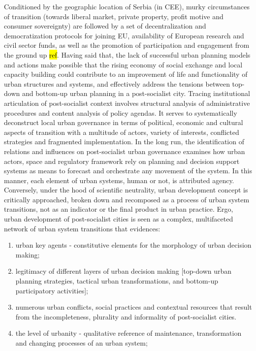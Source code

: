 \documentclass[11pt]{report}
\begin{document}
Conditioned by the geographic location of Serbia (in CEE), murky circumstances of transition (towards liberal market, private property, profit motive and consumer sovereignty) are followed by a set of decentralization and democratization protocols for joining EU, availability of European research and civil sector funds, as well as the promotion of participation and engagement from the ground up \hl{ref}. Having said that, the lack of successful urban planning models and actions make possible that the rising economy of social exchange and local capacity building could contribute to an improvement of life and functionality of urban structures and systems, and effectively address the tensions between top-down and bottom-up urban planning in a post-socialist city. Tracing institutional articulation of post-socialist context involves structural analysis of administrative procedures and content analysis of policy agendas. It serves to systematically deconstruct local urban governance in terms of political, economic and cultural aspects of transition with a multitude of actors, variety of interests, conflicted strategies and fragmented implementation. In the long run, the identification of relations and influences on post-socialist urban governance examines how urban actors, space and regulatory framework rely on planning and decision support systems as means to forecast and orchestrate any movement of the system. In this manner, each element of urban systems, human or not, is attributed agency.
\\
Conversely, under the hood of scientific neutrality, urban development concept is critically approached, broken down and recomposed as a process of urban system transitions, not as an indicator or the final product in urban practice.
Ergo, urban development of post-socialist cities is seen as a complex, multifaceted network of urban system transitions that evidences: 
\begin{enumerate}
\item urban key agents - constitutive elements for the morphology of urban decision making;
\item legitimacy of different layers of urban decision making [top-down urban planning strategies, tactical urban transformations, and bottom-up participatory activities];
\item numerous urban conflicts, social practices and contextual resources that result from the incompleteness, plurality and informality of post-socialist cities.
\item the level of urbanity - qualitative reference of maintenance, transformation and changing processes of an urban system;
\end{enumerate}  
\end{document}
